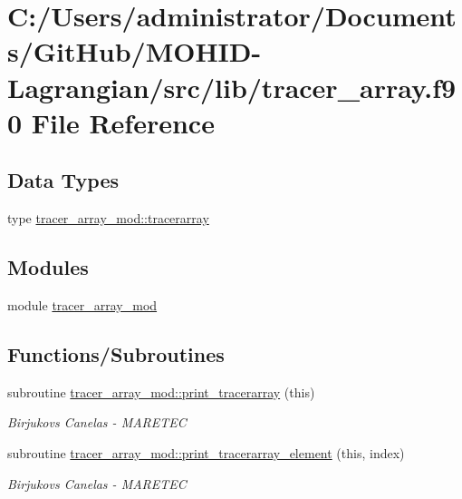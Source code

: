 \hypertarget{tracer__array_8f90}{}\section{C\+:/\+Users/administrator/\+Documents/\+Git\+Hub/\+M\+O\+H\+I\+D-\/\+Lagrangian/src/lib/tracer\+\_\+array.f90 File Reference}
\label{tracer__array_8f90}
\subsection*{Data Types}
\begin{DoxyCompactItemize}
\item 
type \mbox{\hyperlink{structtracer__array__mod_1_1tracerarray}{tracer\+\_\+array\+\_\+mod\+::tracerarray}}
\end{DoxyCompactItemize}
\subsection*{Modules}
\begin{DoxyCompactItemize}
\item 
module \mbox{\hyperlink{namespacetracer__array__mod}{tracer\+\_\+array\+\_\+mod}}
\end{DoxyCompactItemize}
\subsection*{Functions/\+Subroutines}
\begin{DoxyCompactItemize}
\item 
subroutine \mbox{\hyperlink{namespacetracer__array__mod_a173acbcf343367bf87b705fe5ca0dd29}{tracer\+\_\+array\+\_\+mod\+::print\+\_\+tracerarray}} (this)
\begin{DoxyCompactList}\small\item\em Birjukovs Canelas -\/ M\+A\+R\+E\+T\+EC \end{DoxyCompactList}\item 
subroutine \mbox{\hyperlink{namespacetracer__array__mod_ac3b3896987e589190c759e92e95e05af}{tracer\+\_\+array\+\_\+mod\+::print\+\_\+tracerarray\+\_\+element}} (this, index)
\begin{DoxyCompactList}\small\item\em Birjukovs Canelas -\/ M\+A\+R\+E\+T\+EC \end{DoxyCompactList}\end{DoxyCompactItemize}
